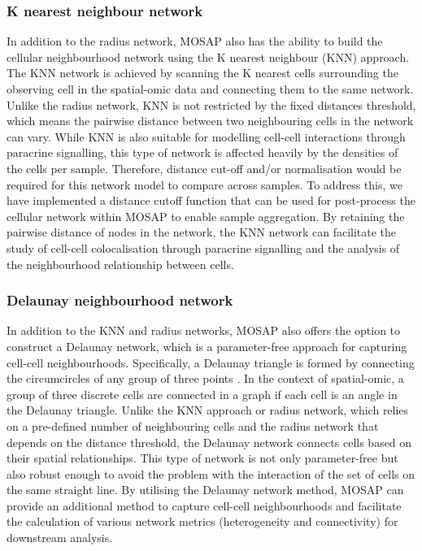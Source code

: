\subsubsection{K nearest neighbour network}
In addition to the radius network, MOSAP also has the ability to build the cellular neighbourhood network using the K nearest neighbour (KNN) approach. The KNN network is achieved by scanning the K nearest cells surrounding the observing cell in the spatial-omic data and connecting them to the same network. Unlike the radius network, KNN is not restricted by the fixed distances threshold, which means the pairwise distance between two neighbouring cells in the network can vary. While KNN is also suitable for modelling cell-cell interactions through paracrine signalling, this type of network is affected heavily by the densities of the cells per sample. Therefore, distance cut-off and/or normalisation would be required for this network model to compare across samples. To address this, we have implemented a distance cutoff function that can be used for post-process the cellular network within MOSAP to enable sample aggregation. By retaining the pairwise distance of nodes in the network, the KNN network can facilitate the study of cell-cell colocalisation through paracrine signalling and the analysis of the neighbourhood relationship between cells.

\subsubsection{Delaunay neighbourhood network}
In addition to the KNN and radius networks, MOSAP also offers the option to construct a Delaunay network, which is a parameter-free approach for capturing cell-cell neighbourhoods. Specifically, a Delaunay triangle is formed by connecting the circumcircles of any group of three points \cite{fortune1995voronoi}. In the context of spatial-omic, a group of three discrete cells are connected in a graph if each cell is an angle in the Delaunay triangle. Unlike the KNN approach or radius network, which relies on a pre-defined number of neighbouring cells and the radius network that depends on the distance threshold, the Delaunay network connects cells based on their spatial relationships. This type of network is not only parameter-free but also robust enough to avoid the problem with the interaction of the set of cells on the same straight line. By utilising the Delaunay network method, MOSAP can provide an additional method to capture cell-cell neighbourhoods and facilitate the calculation of various network metrics (\ie heterogeneity and connectivity) for downstream analysis.   

